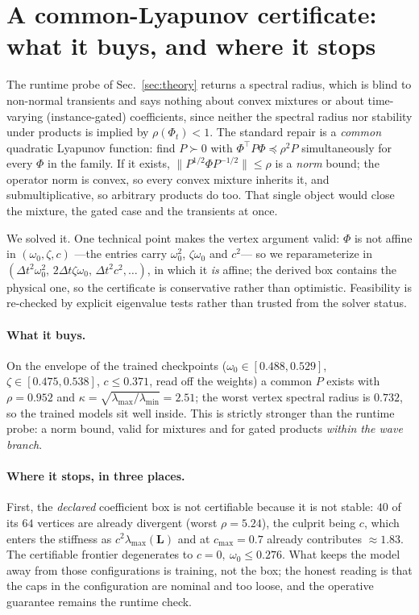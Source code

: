 \documentclass{article}
\begin{document}
{\section{A common-Lyapunov certificate: what it buys, and where it stops}
\label{app:lmi}
The runtime probe of Sec.~\ref{sec:theory} returns a spectral radius, which
is blind to non-normal transients and says nothing about convex mixtures or
about time-varying (instance-gated) coefficients, since neither the spectral
radius nor stability under products is implied by $\rho(\Phi_t)<1$. The
standard repair is a \emph{common} quadratic Lyapunov function: find
$P\succ0$ with $\Phi^\top P\Phi\preceq\rho^2P$ simultaneously for every
$\Phi$ in the family. If it exists, $\lVert P^{1/2}\Phi P^{-1/2}\rVert\le\rho$
is a \emph{norm} bound; the operator norm is convex, so every convex mixture
inherits it, and submultiplicative, so arbitrary products do too. That single
object would close the mixture, the gated case and the transients at once.

We solved it. One technical point makes the vertex argument valid: $\Phi$ is
not affine in $(\omega_0,\zeta,c)$ ---the entries carry $\omega_0^2$,
$\zeta\omega_0$ and $c^2$--- so we reparameterize in
$(\Delta t^2\omega_0^2,\,2\Delta t\zeta\omega_0,\,\Delta t^2c^2,\dots)$, in
which it \emph{is} affine; the derived box contains the physical one, so the
certificate is conservative rather than optimistic. Feasibility is re-checked
by explicit eigenvalue tests rather than trusted from the solver status.

\paragraph{What it buys.} On the envelope of the trained checkpoints
($\omega_0\in[0.488,0.529]$, $\zeta\in[0.475,0.538]$, $c\le0.371$, read off
the weights) a common $P$ exists with $\rho=0.952$ and
$\kappa=\sqrt{\lambda_{\max}/\lambda_{\min}}=2.51$; the worst vertex spectral
radius is $0.732$, so the trained models sit well inside. This is strictly
stronger than the runtime probe: a norm bound, valid for mixtures and for
gated products \emph{within the wave branch}.

\paragraph{Where it stops, in three places.} First, the \emph{declared}
coefficient box is not certifiable because it is not stable: $40$ of its $64$
vertices are already divergent (worst $\rho=5.24$), the culprit being $c$,
which enters the stiffness as $c^2\lambda_{\max}(\mathbf{L})$ and at
$c_{\max}=0.7$ already contributes $\approx1.83$. The certifiable frontier
degenerates to $c=0,\ \omega_0\le0.276$. What keeps the model away from those
configurations is training, not the box; the honest reading is that the caps
in the configuration are nominal and too loose, and the operative guarantee
remains the runtime check.

}
\end{document}
